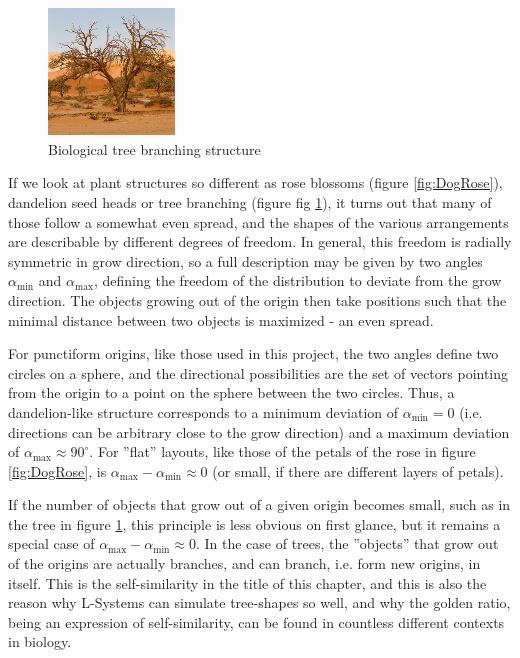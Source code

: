\documentclass[11pt]{scrartcl}
\begin{document}
\begin{figure} 
 	\centering
 		\includegraphics[width=0.3\textwidth]{Pic_Tree.png}
 	\caption{Biological tree branching structure  \cite{WikipediaTree}}
 	\label{fig:IRLTree}
\end{figure}

If we look at plant structures so different as rose blossoms (figure \ref{fig:DogRose}), dandelion seed heads or tree branching (figure fig \ref{fig:IRLTree}), it turns out that many of those follow a somewhat even spread, and the shapes of the various arrangements are describable by different degrees of freedom. In general, this freedom is radially symmetric in grow direction, so a full description may be given by two angles $\alpha_\text{min}$ and $\alpha_\text{max}$, defining the freedom of the distribution to deviate from the grow direction. The objects growing out of the origin then take positions such that the minimal distance between two objects is maximized - an even spread.

For punctiform origins, like those used in this project, the two angles define two circles on a sphere, and the directional possibilities are the set of vectors pointing from the origin to a point on the sphere between the two circles. Thus, a dandelion-like structure corresponds to a minimum deviation of $\alpha_\text{min} = 0$ (i.e. directions can be arbitrary close to the grow direction) and a maximum deviation of 
$\alpha_\text{max} \approx 90^\circ$. For ''flat'' layouts, like those of the petals of the rose in figure \ref{fig:DogRose}, is $\alpha_\text{max} - \alpha_\text{min} \approx 0$ (or small, if there are different layers of petals).

If the number of objects that grow out of a given origin becomes small, such as in the tree in figure \ref{fig:IRLTree}, this principle is less obvious on first glance, but it remains a special case of $\alpha_\text{max} - \alpha_\text{min} \approx 0$. In the case of trees, the ''objects'' that grow out of the origins are actually branches, and can branch, i.e. form new origins, in itself. This is the self-similarity in the title of this chapter, and this is also the reason why L-Systems can simulate tree-shapes so well, and why the golden ratio, being an expression of self-similarity, can be found in countless different contexts in biology.
\end{document}
